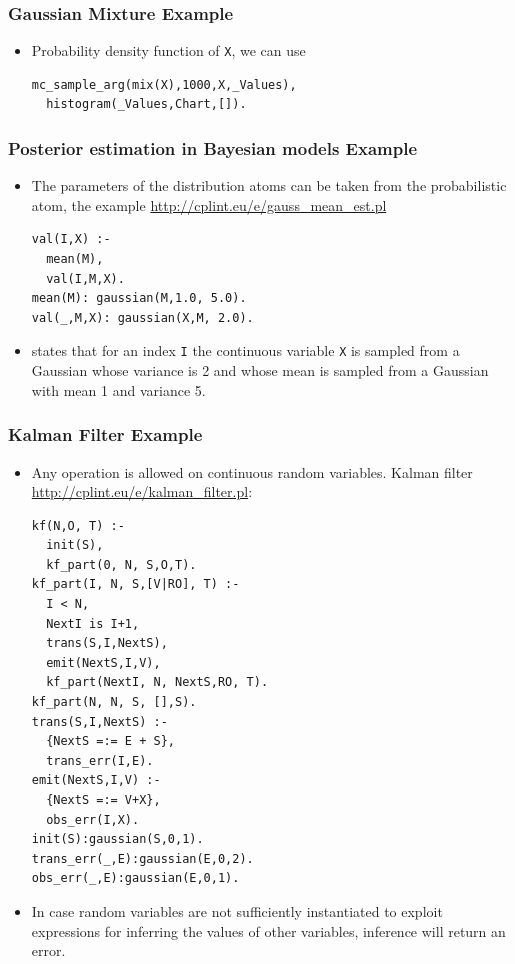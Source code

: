 \documentclass[trans]{beamer}
\begin{document}
\begin{frame}[fragile]
  \frametitle{Gaussian Mixture Example}
  \begin{itemize}
\item Probability density function of \verb|X|, we can use
\begin{verbatim}
mc_sample_arg(mix(X),1000,X,_Values), 
  histogram(_Values,Chart,[]).
\end{verbatim}

\end{itemize}
\end{frame}
\begin{frame}[fragile]
  \frametitle{Posterior estimation in Bayesian models Example}
  \begin{itemize}
  \item
The parameters of the distribution atoms can be taken from the probabilistic
atom, the example \url{http://cplint.eu/e/gauss_mean_est.pl}
\begin{verbatim}
val(I,X) :-
  mean(M),
  val(I,M,X).
mean(M): gaussian(M,1.0, 5.0).
val(_,M,X): gaussian(X,M, 2.0).
\end{verbatim}
  \item
states that for an index \verb|I| the continuous variable \verb|X| is 
sampled from a Gaussian whose variance is 2 and whose mean is sampled from a Gaussian with mean 1 and
variance 5.
\end{itemize}
\end{frame}
\begin{frame}[fragile]
  \frametitle{Kalman Filter Example}
  \begin{itemize}
  \item
Any operation is allowed on continuous random variables.  Kalman filter
\url{http://cplint.eu/e/kalman_filter.pl}:
\begin{tiny}
\begin{verbatim}
kf(N,O, T) :-
  init(S),
  kf_part(0, N, S,O,T).
kf_part(I, N, S,[V|RO], T) :-
  I < N,
  NextI is I+1,
  trans(S,I,NextS),
  emit(NextS,I,V),
  kf_part(NextI, N, NextS,RO, T).
kf_part(N, N, S, [],S).
trans(S,I,NextS) :-
  {NextS =:= E + S},
  trans_err(I,E).
emit(NextS,I,V) :-
  {NextS =:= V+X},
  obs_err(I,X).
init(S):gaussian(S,0,1).
trans_err(_,E):gaussian(E,0,2).
obs_err(_,E):gaussian(E,0,1).
\end{verbatim}
\end{tiny}
\item In case random variables are not sufficiently instantiated to 
exploit expressions for inferring the values of other variables, 
inference will return an error.
\end{itemize}
\end{frame}
\end{document}
